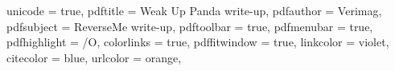 
\usepackage[utf8]{inputenc}
\usepackage[T1]{fontenc}







\usepackage[titletoc]{appendix}

\usepackage{csquotes}

\usepackage[sorting=anyt,sortcites=true,backend=biber,url=false,doi=false,maxnames=7,isbn=false,firstinits=true,style=numeric]{biblatex}
% 




\usepackage[english]{babel}

\usepackage{braket}
\usepackage{amsmath,amssymb,mathtools,amsthm}
\usepackage{nicefrac}
\usepackage{stmaryrd}
\usepackage{xfrac}


\usepackage{algorithm2e}
\SetAlFnt{\small}

\usepackage{hyperref}
\hypersetup
{
  unicode         = true,
  pdftitle        = Weak Up Panda write-up,
  pdfauthor       = Verimag, %
  pdfsubject      = ReverseMe write-up,
  pdftoolbar      = true, %
  pdfmenubar      = true, %
  pdfhighlight    = /O, %
  colorlinks      = true, %
  pdffitwindow    = true, %
  linkcolor       = violet, %
  citecolor       = blue, %
  urlcolor        = orange, %
}

